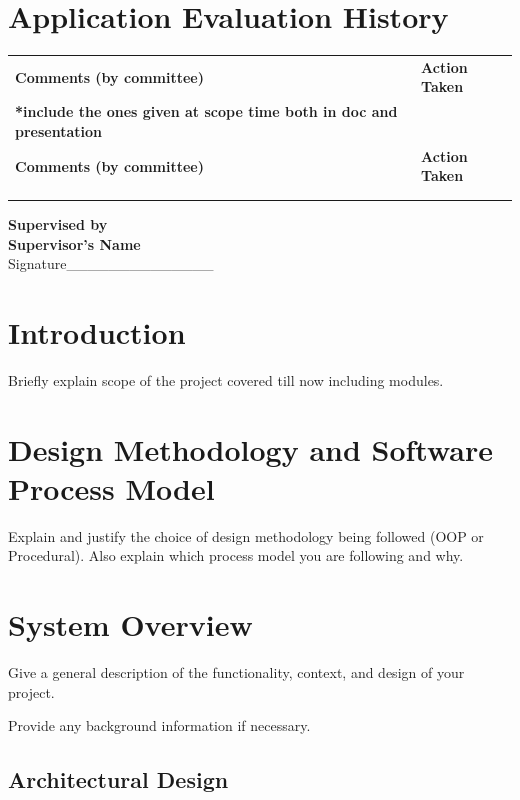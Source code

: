 \documentclass[12pt,a4paper]{report}
\begin{document}
\chapter*{Application Evaluation History}

\begin{longtable}{|p{7cm}|p{7cm}|}
\hline
\textbf{Comments (by committee)} & \textbf{Action Taken} \\
\textbf{*include the ones given at scope time both in doc and presentation} & \\
\hline
\endfirsthead
\hline
\textbf{Comments (by committee)} & \textbf{Action Taken} \\
\hline
\endhead
 & \\
\hline
 & \\
\hline
\end{longtable}

\vspace{1cm}
\noindent\textbf{Supervised by}\\
\textbf{Supervisor's Name}\\
Signature\_\_\_\_\_\_\_\_\_\_\_\_\_\_

\chapter{Introduction}

Briefly explain scope of the project covered till now including modules.

\chapter{Design Methodology and Software Process Model}

Explain and justify the choice of design methodology being followed (OOP or Procedural). Also explain which process model you are following and why.

\chapter{System Overview}

Give a general description of the functionality, context, and design of your project.

Provide any background information if necessary.

\section{Architectural Design}
\end{document}
